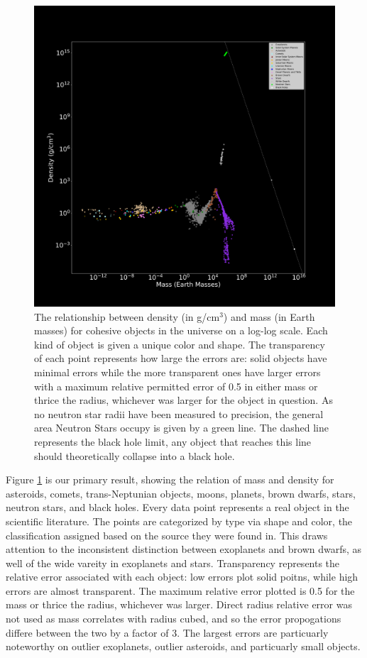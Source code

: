 \documentclass[twocolumn,linenumbers]{aastex631}
\begin{document}
\begin{figure}[htbp]
\centering
\includegraphics[scale = 0.7]{MassDensityPlot.pdf}
\centering
\caption{The relationship between density (in g/cm$^3$) and mass (in Earth masses) for cohesive objects in the universe on a log-log scale. Each kind of object is given a unique color and shape. The transparency of each point represents how large the errors are: solid objects have minimal errors while the more transparent ones have larger errors with a maximum relative permitted error of 0.5 in either mass or thrice the radius, whichever was larger for the object in question. As no  neutron star radii have been measured to precision, the general area Neutron Stars occupy is given by a green line. The dashed line represents the black hole limit, any object that reaches this line should theoretically collapse into a black hole. }
\label{fig:1}
\end{figure}

Figure \ref{fig:1} is our primary result, showing the relation of mass and density for asteroids, comets, trans-Neptunian objects, moons, planets, brown dwarfs, stars, neutron stars, and black holes. Every data point represents a real object in the scientific literature. The points are categorized by type via shape and color, the classification assigned based on the source they were found in. This draws attention to the inconsistent distinction between exoplanets and brown dwarfs, as well of the wide vareity in exoplanets and stars. Transparency represents the relative error associated with each object: low errors plot solid poitns, while high errors are almost transparent. The maximum relative error plotted is 0.5 for the mass or thrice the radius, whichever was larger. Direct radius relative error was not used as mass correlates with radius cubed, and so the error propogations differe between the two by a factor of 3. The largest errors are particuarly noteworthy on outlier exoplanets, outlier asteroids, and particuarly small objects. 
\end{document}
